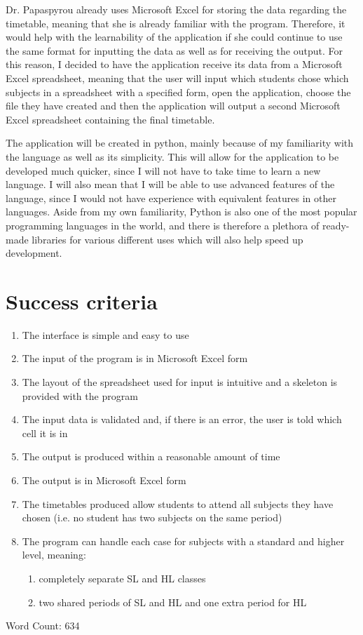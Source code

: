 \documentclass[a4paper, 12pt]{article}
\begin{document}
Dr. Papaspyrou already uses Microsoft Excel for storing the data regarding the timetable,
meaning that she is already familiar with the program. Therefore, it would help with the
learnability of the application if she could continue to use the same format for inputting
the data as well as for receiving the output. For this reason, I decided to have the
application receive its data from a Microsoft Excel spreadsheet, meaning that the user will
input which students chose which subjects in a spreadsheet with a specified form, open the
application, choose the file they have created and then the application will output a second
Microsoft Excel spreadsheet containing the final timetable.

The application will be created in python, mainly because of my familiarity with the
language as well as its simplicity. This will allow for the application to be developed much
quicker, since I will not have to take time to learn a new language. I will also mean that I
will be able to use advanced features of the language, since I would not have experience
with equivalent features in other languages. Aside from my own familiarity, Python is also
one of the most popular programming languages in the world, and there is therefore a
plethora of ready-made libraries for various different uses which will also help speed up
development. 

\section{Success criteria}

\begin{enumerate}
    \item The interface is simple and easy to use
    \item The input of the program is in Microsoft Excel form
    \item The layout of the spreadsheet used for input is intuitive and a skeleton is
        provided with the program
    \item The input data is validated and, if there is an error, the user is told which cell
        it is in
    \item The output is produced within a reasonable amount of time
    \item The output is in Microsoft Excel form
    \item The timetables produced allow students to attend all subjects they have chosen
        (i.e. no student has two subjects on the same period)
    \item The program can handle each case for subjects with a standard and higher level,
        meaning:
        \begin{enumerate}
            \item completely separate SL and HL classes
            \item two shared periods of SL and HL and one extra period for HL
        \end{enumerate}
\end{enumerate}

Word Count: 634
\end{document}
